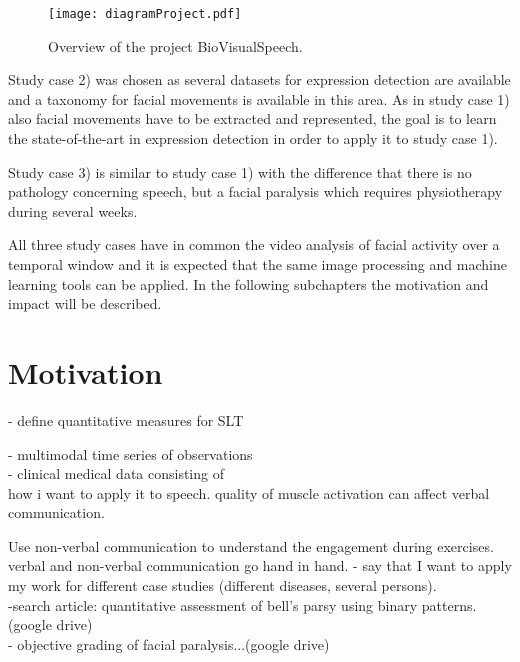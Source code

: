 \begin{figure}
    \centering
    \texttt{[image: diagramProject.pdf]}
    \caption{Overview of the project BioVisualSpeech.}
    \label{fig:project}
\end{figure}

Study case 2) was chosen as several datasets for expression detection are available and a taxonomy for facial movements is available in this area. As in study case 1) also facial movements have to be extracted and represented, the goal is to learn the state-of-the-art in expression detection in order to apply it to study case 1).

Study case 3) is similar to study case 1) with the difference that there is no pathology concerning speech, but a facial paralysis which requires physiotherapy during several weeks. 

All three study cases have in common the video analysis of facial activity over a temporal window and it is expected that the same image processing and machine learning tools can be applied. In the following subchapters the motivation and impact will be described.  




\section{Motivation} %
\label{sec:motivation}
- define quantitative measures for SLT

- multimodal time series of observations\\
- clinical medical data consisting of \\

how i want to apply it to speech. quality of muscle activation can affect verbal communication. 

Use non-verbal communication to understand the engagement during exercises.\\

verbal and non-verbal communication go hand in hand.
- say that I want to apply my work for different case studies (different diseases, several persons).\\
-search article: quantitative assessment of bell's parsy using binary patterns. (google drive)\\
- objective grading of facial paralysis...(google drive)

